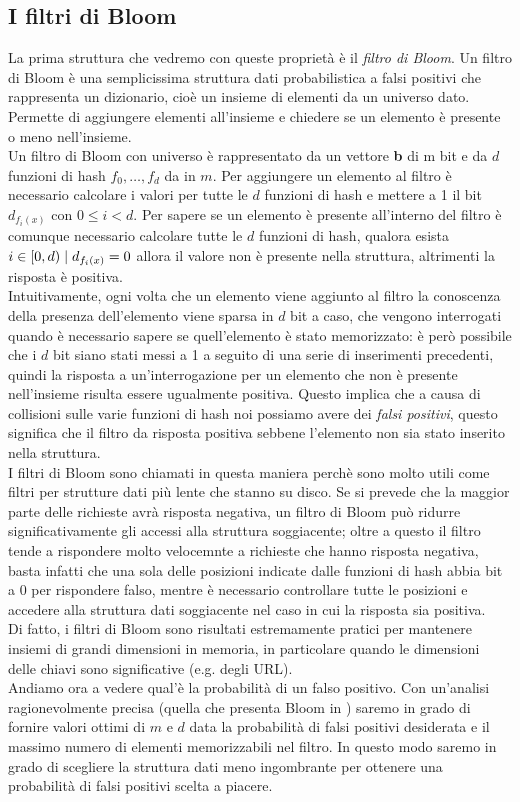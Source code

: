 \subsection{I filtri di Bloom}
La prima struttura che vedremo con queste proprietà è il \textit{filtro di Bloom}. Un filtro di Bloom \cite{Bloom} è una semplicissima struttura dati probabilistica a falsi positivi che rappresenta un dizionario, cioè un insieme di elementi da un universo dato. Permette di aggiungere elementi all'insieme e chiedere se un elemento è presente o meno nell'insieme.\\
Un filtro di Bloom con universo  è rappresentato da un vettore \textbf{b} di m bit e da $d$ funzioni di hash $f_0, \dots, f_d$ da  in $m$. Per aggiungere un elemento al filtro è necessario calcolare i valori per tutte le $d$ funzioni di hash e mettere a 1 il bit $d_{f_i(x)}$ con $0 \leq i < d$. Per sapere se un elemento è presente all'interno del filtro è comunque necessario calcolare tutte le $d$ funzioni di hash, qualora esista $i \in [0, d) \hspace{1mm}|\hspace{1mm} d_{f_i(x)} = 0$ allora il valore non è presente nella struttura, altrimenti la risposta è positiva.\\
Intuitivamente, ogni volta che un elemento viene aggiunto al filtro la conoscenza della presenza dell'elemento viene sparsa in $d$ bit a caso, che vengono interrogati quando è necessario sapere se quell'elemento è stato memorizzato: è però possibile che i $d$ bit siano stati messi a 1 a seguito di una serie di inserimenti precedenti, quindi la risposta a un'interrogazione per un elemento che non è presente nell'insieme risulta essere ugualmente positiva. Questo implica che a causa di collisioni sulle varie funzioni di hash noi possiamo avere dei \textit{falsi positivi}, questo significa che il filtro da risposta positiva sebbene l'elemento non sia stato inserito nella struttura.\\
I filtri di Bloom sono chiamati in questa maniera perchè sono molto utili come filtri per strutture dati più lente che stanno su disco. Se si prevede che la maggior parte delle richieste avrà risposta negativa, un filtro di Bloom può ridurre significativamente gli accessi alla struttura soggiacente; oltre a questo il filtro tende a rispondere molto velocemnte a richieste che hanno risposta negativa, basta infatti che una sola delle posizioni indicate dalle funzioni di hash abbia bit a 0 per rispondere falso, mentre è necessario controllare tutte le posizioni e accedere alla struttura dati soggiacente nel caso in cui la risposta sia positiva.\\
Di fatto, i filtri di Bloom sono risultati estremamente pratici per mantenere insiemi di grandi dimensioni in memoria, in particolare quando le dimensioni delle chiavi sono significative (e.g. degli URL).\\
Andiamo ora a vedere qual'è la probabilità di un falso positivo. Con un'analisi ragionevolmente precisa (quella che presenta Bloom in \cite{Bloom}) saremo in grado di fornire valori ottimi di $m$ e $d$ data la probabilità di falsi positivi desiderata e il massimo numero di elementi memorizzabili nel filtro. In questo modo saremo in grado di scegliere la struttura dati meno ingombrante per ottenere una probabilità di falsi positivi scelta a piacere.\\
